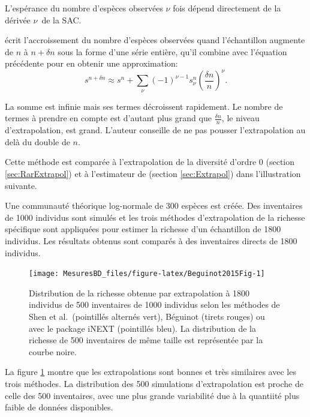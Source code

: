 \documentclass[
  11pt,
  french,
  a4paper,
  extrafontsizes,onecolumn,openright
  ]{memoir}
\begin{document}
L'espérance du nombre d'espèces observées \(\nu\) fois dépend directement de la dérivée \(\nu\)\ieme~de la SAC.

\textcite{Beguinot2015} écrit l'accroissement du nombre d'espèces observées quand l'échantillon augmente de \(n\) à \(n +\delta n\) sous la forme d'une série entière, qu'il combine avec l'équation précédente pour en obtenir une approximation:
\begin{equation}
  s^{n +\delta n}
  \approx s^{n} + \sum_\nu {\left(-1 \right)^{\nu-1} s^{n}_{\nu} \left(\frac{\delta n}{n}\right)^{\nu}}.
\end{equation}

La somme est infinie mais ses termes décroissent rapidement.
Le nombre de termes à prendre en compte est d'autant plus grand que \(\frac{\delta n}{n}\), le niveau d'extrapolation, est grand.
L'auteur conseille de ne pas pousser l'extrapolation au delà du double de \(n\).

Cette méthode est comparée à l'extrapolation de la diversité d'ordre 0 (section \ref{sec:RarExtrapol}) et à l'estimateur de \textcite{Shen2003} (section \ref{sec:Extrapol}) dans l'illustration suivante.

Une communauté théorique log-normale de 300 espèces est créée.
Des inventaires de 1000 individus sont simulés et les trois méthodes d'extrapolation de la richesse spécifique sont appliquées pour estimer la richesse d'un échantillon de 1800 individus.
Les résultats obtenus sont comparés à des inventaires directs de 1800 individus.



\scriptsize

\begin{figure}

{\centering \texttt{[image: MesuresBD\_files/figure-latex/Beguinot2015Fig-1]} 

}

\caption{Distribution de la richesse obtenue par extrapolation à 1800 individus de 500 inventaires de 1000 individus selon les méthodes de Shen et al.~(pointillés alternés vert), Béguinot (tirets rouges) ou avec le package iNEXT (pointillés bleu). La distribution de la richesse de 500 inventaires de même taille est représentée par la courbe noire.}\label{fig:Beguinot2015Fig}
\end{figure}

\normalsize

La figure \ref{fig:Beguinot2015Fig} montre que les extrapolations sont bonnes et très similaires avec les trois méthodes.
La distribution des 500 simulations d'extrapolation est proche de celle des 500 inventaires, avec une plus grande variabilité due à la quantiité plus faible de données disponibles.
\end{document}
